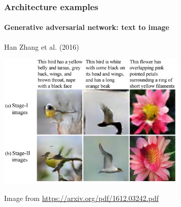 \documentclass[9pt]{beamer}
\begin{document}
\begin{frame}
  \frametitle{Architecture examples}

  \framesubtitle{Generative adversarial network: text to image}

  Han Zhang et al. (2016)

  \begin{center}
    \includegraphics[width=9cm]{images/GAN_2.jpg}
  \end{center}

  {\small Image from \url{https://arxiv.org/pdf/1612.03242.pdf}}
\end{frame}
\end{document}
